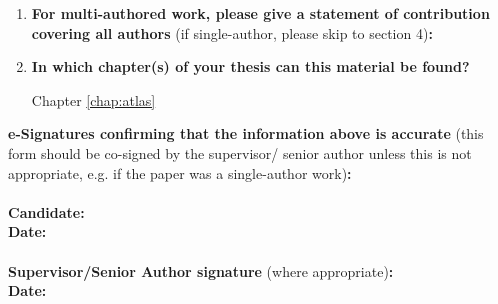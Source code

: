 {\begin{enumerate}[leftmargin=*,label={\bfseries\arabic*.}]
\begin{enumerate}[label={\alph*)}]
	Proceedings of the 
	\item \textbf{List the manuscript's authors in the intended authorship order:}

	\citeauthor*{Young2023}
	\item \textbf{Stage of publication:}

	Work presented at conference, copyright transferred to IEEE, yet now indication of if/when proceedings may be published (copyright on submitted version retained).
\end{enumerate}

\item \textbf{For multi-authored work, please give a statement of contribution covering all authors} (if single-author, please skip to section 4)\textbf{:}
\item \textbf{In which chapter(s) of your thesis can this material be found?}

Chapter \ref{chap:atlas}
\end{enumerate}

\textbf{e-Signatures confirming that the information above is accurate}
(this form should be co-signed by the supervisor/ senior author unless this is not appropriate, e.g. if the paper was a single-author work)\textbf{:}\\
\textbf{}\\
\textbf{Candidate:}\\
\textbf{Date:}\\
\textbf{}\\
\textbf{Supervisor/Senior Author signature} (where appropriate)\textbf{:}\\
\textbf{Date:}
%

}
